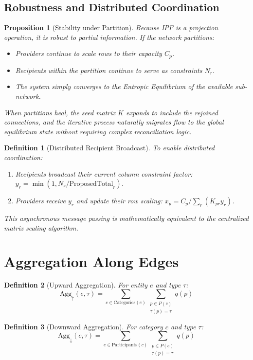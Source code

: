 \documentclass[11pt]{article}
\newtheorem{definition}{Definition}
\newtheorem{proposition}{Proposition}
\begin{document}
\subsection{Robustness and Distributed Coordination}

\begin{proposition}[Stability under Partition]
Because IPF is a projection operation, it is robust to partial information. If the network partitions:
\begin{itemize}
    \item Providers continue to scale rows to their capacity $C_p$.
    \item Recipients within the partition continue to serve as constraints $N_r$.
    \item The system simply converges to the Entropic Equilibrium of the \emph{available} sub-network.
\end{itemize}
When partitions heal, the seed matrix $K$ expands to include the rejoined connections, and the iterative process naturally migrates flow to the global equilibrium state without requiring complex reconciliation logic.
\end{proposition}

\begin{definition}[Distributed Recipient Broadcast]
To enable distributed coordination:
\begin{enumerate}
    \item Recipients broadcast their current column constraint factor: $y_r = \min(1, N_r / \text{ProposedTotal}_r)$.
    \item Providers receive $y_r$ and update their row scaling: $x_p = C_p / \sum_r (K_{pr} y_r)$.
\end{enumerate}
This asynchronous message passing is mathematically equivalent to the centralized matrix scaling algorithm.
\end{definition}

\section{Aggregation Along Edges}

\begin{definition}[Upward Aggregation]
For entity $e$ and type $\tau$:
\[
\text{Agg}_\uparrow(e, \tau) = \sum_{c \in \text{Categories}(e)} \sum_{\substack{p \in P(c) \\ \tau(p) = \tau}} q(p)
\]
\end{definition}

\begin{definition}[Downward Aggregation]
For category $c$ and type $\tau$:
\[
\text{Agg}_\downarrow(c, \tau) = \sum_{e \in \text{Participants}(c)} \sum_{\substack{p \in P(e) \\ \tau(p) = \tau}} q(p)
\]
\end{definition}
\end{document}
